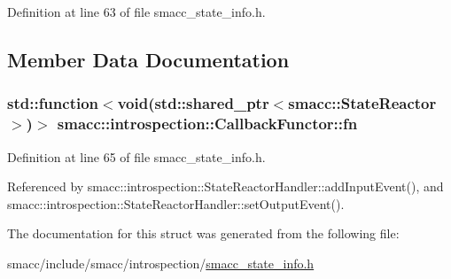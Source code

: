 Definition at line 63 of file smacc\+\_\+state\+\_\+info.\+h.



\subsection{Member Data Documentation}
\subsubsection[{\texorpdfstring{fn}{fn}}]{\setlength{\rightskip}{0pt plus 5cm}std\+::function$<$void(std\+::shared\+\_\+ptr$<${\bf smacc\+::\+State\+Reactor}$>$)$>$ smacc\+::introspection\+::\+Callback\+Functor\+::fn}\hypertarget{structsmacc_1_1introspection_1_1CallbackFunctor_a459e9ea2fb050739b927c4722c843e51}{}\label{structsmacc_1_1introspection_1_1CallbackFunctor_a459e9ea2fb050739b927c4722c843e51}


Definition at line 65 of file smacc\+\_\+state\+\_\+info.\+h.



Referenced by smacc\+::introspection\+::\+State\+Reactor\+Handler\+::add\+Input\+Event(), and smacc\+::introspection\+::\+State\+Reactor\+Handler\+::set\+Output\+Event().



The documentation for this struct was generated from the following file\+:\begin{DoxyCompactItemize}
\item 
smacc/include/smacc/introspection/\hyperlink{smacc__state__info_8h}{smacc\+\_\+state\+\_\+info.\+h}\end{DoxyCompactItemize}
